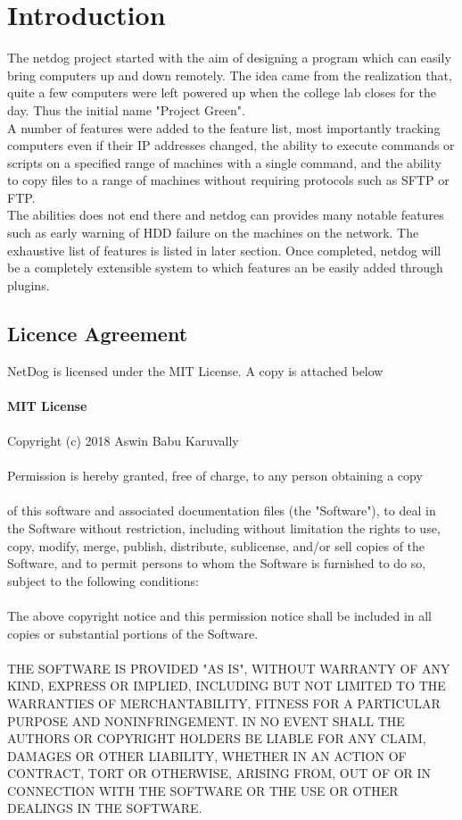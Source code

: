 \chapter{Introduction}
	
\par
The netdog project started with the aim of designing a program which can easily
bring computers up and down remotely. The idea came from the realization that,
quite a few computers were left powered up when the college lab closes for the
day. Thus the initial name "Project Green".\\

A number of features were added to the feature list, most importantly tracking
computers even if their IP addresses changed, the ability to execute commands
or scripts on a specified range of machines with a single command, and the
ability to copy files to a range of machines without requiring protocols such
as SFTP or FTP.\\

The abilities does not end there and netdog can provides many notable features
such as early warning of HDD failure on the machines on the network. The
exhaustive list of features is listed in later section. Once completed, netdog
will be a completely extensible system to which features an be easily added
through plugins.\\
\newpage 

\section{Licence Agreement}
NetDog is licensed under the MIT License. A copy is attached below\\\\
\textbf{MIT License}\\\\
Copyright (c) 2018 Aswin Babu Karuvally\\\\
Permission is hereby granted, free of charge, to any person obtaining a copy\\\\
of this software and associated documentation files (the "Software"), to deal
in the Software without restriction, including without limitation the rights
to use, copy, modify, merge, publish, distribute, sublicense, and/or sell
copies of the Software, and to permit persons to whom the Software is
furnished to do so, subject to the following conditions:\\\\
The above copyright notice and this permission notice shall be included in all
copies or substantial portions of the Software.\\\\
THE SOFTWARE IS PROVIDED "AS IS", WITHOUT WARRANTY OF ANY KIND, EXPRESS OR
IMPLIED, INCLUDING BUT NOT LIMITED TO THE WARRANTIES OF MERCHANTABILITY,
FITNESS FOR A PARTICULAR PURPOSE AND NONINFRINGEMENT. IN NO EVENT SHALL THE 
AUTHORS OR COPYRIGHT HOLDERS BE LIABLE FOR ANY CLAIM, DAMAGES OR OTHER
LIABILITY, WHETHER IN AN ACTION OF CONTRACT, TORT OR OTHERWISE, ARISING FROM,
OUT OF OR IN CONNECTION WITH THE SOFTWARE OR THE USE OR OTHER DEALINGS IN THE 
SOFTWARE.

